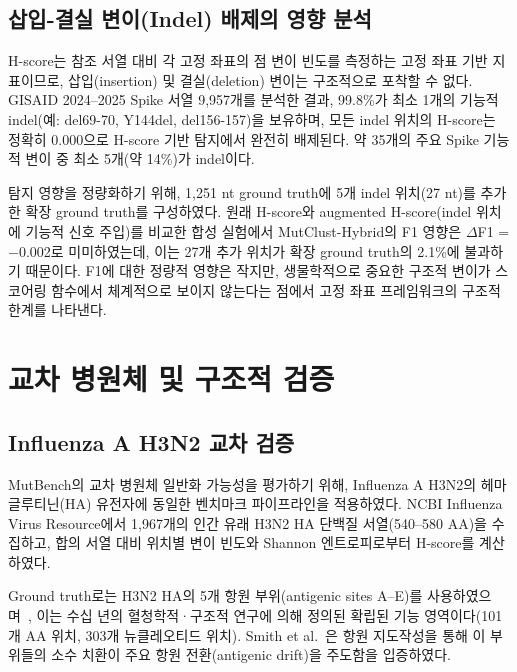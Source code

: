 \subsection{삽입-결실 변이(Indel) 배제의 영향 분석}
\label{sec:indel_analysis}


H-score는 참조 서열 대비 각 고정 좌표의 점 변이 빈도를 측정하는 고정 좌표 기반 지표이므로, 삽입(insertion) 및 결실(deletion) 변이는 구조적으로 포착할 수 없다.
GISAID 2024--2025 Spike 서열 9,957개를 분석한 결과, 99.8\%가 최소 1개의 기능적 indel(예: del69-70, Y144del, del156-157)을 보유하며, 모든 indel 위치의 H-score는 정확히 0.000으로 H-score 기반 탐지에서 완전히 배제된다.
약 35개의 주요 Spike 기능적 변이 중 최소 5개(약 14\%)가 indel이다.

탐지 영향을 정량화하기 위해, 1,251 nt ground truth에 5개 indel 위치(27 nt)를 추가한 확장 ground truth를 구성하였다.
원래 H-score와 augmented H-score(indel 위치에 기능적 신호 주입)를 비교한 합성 실험에서 MutClust-Hybrid의 F1 영향은 $\Delta$F1 = $-$0.002로 미미하였는데, 이는 27개 추가 위치가 확장 ground truth의 2.1\%에 불과하기 때문이다.
F1에 대한 정량적 영향은 작지만, 생물학적으로 중요한 구조적 변이가 스코어링 함수에서 체계적으로 보이지 않는다는 점에서 고정 좌표 프레임워크의 구조적 한계를 나타낸다.

\section{교차 병원체 및 구조적 검증}
\label{sec:cross_pathogen_structural}

\subsection{Influenza A H3N2 교차 검증}
\label{sec:influenza_validation}


MutBench의 교차 병원체 일반화 가능성을 평가하기 위해, Influenza A H3N2의 헤마글루티닌(HA) 유전자에 동일한 벤치마크 파이프라인을 적용하였다.
NCBI Influenza Virus Resource에서 1,967개의 인간 유래 H3N2 HA 단백질 서열(540--580 AA)을 수집하고, 합의 서열 대비 위치별 변이 빈도와 Shannon 엔트로피로부터 H-score를 계산하였다.

Ground truth로는 H3N2 HA의 5개 항원 부위(antigenic sites A--E)를 사용하였으며~\cite{wiley1981structural,wilson1990structural}, 이는 수십 년의 혈청학적·구조적 연구에 의해 정의된 확립된 기능 영역이다(101개 AA 위치, 303개 뉴클레오티드 위치). Smith et al.~\cite{smith2004antigenic}은 항원 지도작성을 통해 이 부위들의 소수 치환이 주요 항원 전환(antigenic drift)을 주도함을 입증하였다.

